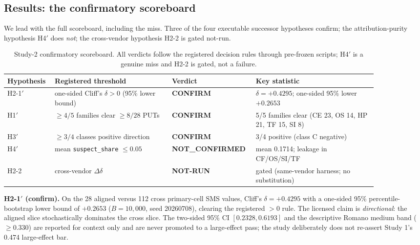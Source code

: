 \documentclass[manuscript,screen,review]{acmart}
\begin{document}
\subsection{Results: the confirmatory scoreboard}\label{study2-scoreboard}

We lead with the full scoreboard, including the miss. Three of the four
executable successor hypotheses confirm; the attribution-purity
hypothesis H4\('\) does \emph{not}; the cross-vendor hypothesis H2-2 is
gated not-run.

\begin{table}[t]
\caption{Study-2 confirmatory scoreboard. All verdicts follow the
registered decision rules through pre-frozen scripts; H4\('\) is a
genuine miss and H2-2 is gated, not a failure.}
\label{tab:study2-scoreboard}
\centering
\small
\begin{tabular}{p{0.11\linewidth}p{0.30\linewidth}p{0.16\linewidth}p{0.31\linewidth}}
\toprule
Hypothesis & Registered threshold & Verdict & Key statistic \\
\midrule
H2-1\('\) & one-sided Cliff's \(\delta > 0\) (95\% lower bound) &
\textbf{CONFIRM} & \(\delta = +0.4295\); one-sided 95\% lower \(+0.2653\)
\\
H1\('\) & \(\geq 4/5\) families clear \(\geq 8/28\) PUTs &
\textbf{CONFIRM} & 5/5 families clear (CE 23, OS 14, HP 21, TF 15, SI 8)
\\
H3\('\) & \(\geq 3/4\) classes positive direction & \textbf{CONFIRM} &
3/4 positive (class C negative) \\
H4\('\) & mean \texttt{suspect\_share} \(\leq 0.05\) &
\textbf{NOT\_CONFIRMED} & mean 0.1714; leakage in CF/OS/SI/TF \\
H2-2 & cross-vendor \(\Delta\delta\) & \textbf{NOT-RUN} & gated
(same-vendor harness; no substitution) \\
\bottomrule
\end{tabular}
\normalsize
\end{table}

\textbf{H2-1\('\) (confirm).} On the 28 aligned versus 112 cross
primary-cell SMS values, Cliff's \(\delta = +0.4295\) with a one-sided
95\% percentile-bootstrap lower bound of \(+0.2653\) (\(B = 10{,}000\),
seed 20260708), clearing the registered \(>0\) rule. The licensed claim
is \emph{directional}: the aligned slice stochastically dominates the
cross slice. The two-sided 95\% CI \([0.2328, 0.6193]\) and the
descriptive Romano medium band (\(\geq 0.330\)) are reported for context
only and are never promoted to a large-effect pass; the study
deliberately does not re-assert Study 1's 0.474 large-effect bar.
\end{document}
